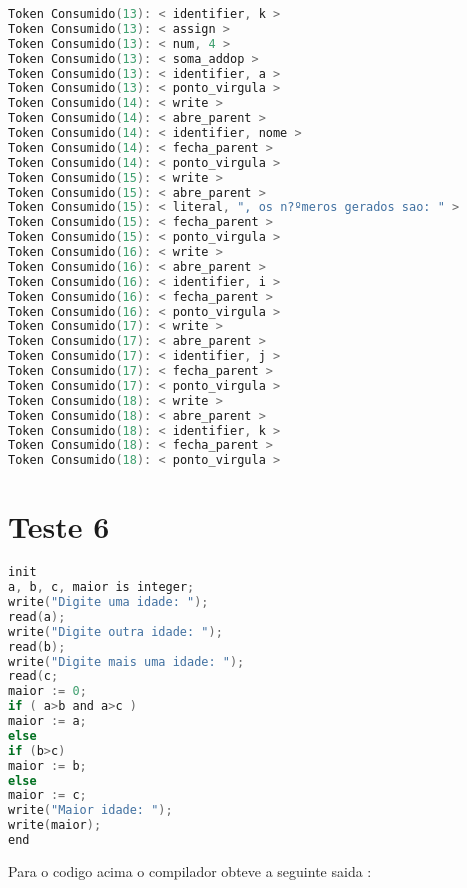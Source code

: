 \begin{lstlisting}[caption={Saida Correta para o Codigo de teste  : Teste5.txt},label={Entrada 1},language=C]
Token Consumido(13): < identifier, k >
Token Consumido(13): < assign >
Token Consumido(13): < num, 4 >
Token Consumido(13): < soma_addop >
Token Consumido(13): < identifier, a >
Token Consumido(13): < ponto_virgula >
Token Consumido(14): < write >
Token Consumido(14): < abre_parent >
Token Consumido(14): < identifier, nome >
Token Consumido(14): < fecha_parent >
Token Consumido(14): < ponto_virgula >
Token Consumido(15): < write >
Token Consumido(15): < abre_parent >
Token Consumido(15): < literal, ", os n?ºmeros gerados sao: " >
Token Consumido(15): < fecha_parent >
Token Consumido(15): < ponto_virgula >
Token Consumido(16): < write >
Token Consumido(16): < abre_parent >
Token Consumido(16): < identifier, i >
Token Consumido(16): < fecha_parent >
Token Consumido(16): < ponto_virgula >
Token Consumido(17): < write >
Token Consumido(17): < abre_parent >
Token Consumido(17): < identifier, j >
Token Consumido(17): < fecha_parent >
Token Consumido(17): < ponto_virgula >
Token Consumido(18): < write >
Token Consumido(18): < abre_parent >
Token Consumido(18): < identifier, k >
Token Consumido(18): < fecha_parent >
Token Consumido(18): < ponto_virgula >


\end{lstlisting}\newline



\section{Teste 6}


\begin{lstlisting}[caption={Teste6.txt},label={lst:label},language=C]
init
a, b, c, maior is integer;
write("Digite uma idade: ");
read(a);
write("Digite outra idade: ");
read(b);
write("Digite mais uma idade: ");
read(c;
maior := 0;
if ( a>b and a>c )
maior := a;
else
if (b>c)
maior := b;
else
maior := c;
write("Maior idade: ");
write(maior);
end
\end{lstlisting}

Para o codigo acima o compilador obteve a seguinte saida :

